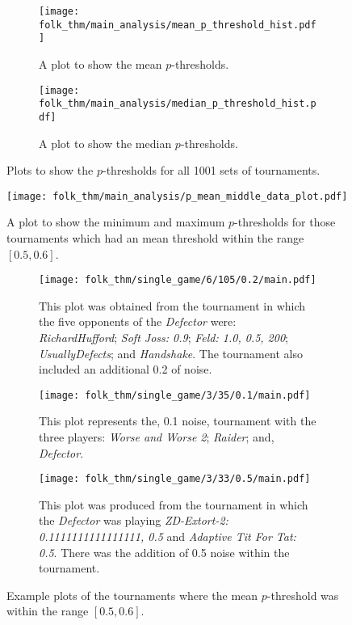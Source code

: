 \begin{figure}
    \begin{subfigure}{.45\textwidth}
        \centering
        \texttt{[image: folk\_thm/main\_analysis/mean\_p\_threshold\_hist.pdf]}
        \caption{A plot to show the mean \(p\)-thresholds.}\label{subfig:mean_p_thresh}
    \end{subfigure}
    \begin{subfigure}{.45\textwidth}
        \centering
        \texttt{[image: folk\_thm/main\_analysis/median\_p\_threshold\_hist.pdf]}
        \caption{A plot to show the median \(p\)-thresholds.}\label{subfig:median_p_thresh}
    \end{subfigure}
    \caption{Plots to show the \(p\)-thresholds for all 1001 sets of tournaments.}\label{fig:mean_median_p_thresh}
\end{figure}


\begin{figure}
    \centering
    \texttt{[image: folk\_thm/main\_analysis/p\_mean\_middle\_data\_plot.pdf]}
    \caption{A plot to show the minimum and maximum \(p\)-thresholds for those tournaments which had an mean threshold within the range \([0.5, 0.6]\).}\label{fig:p_mean_middle_plot}
\end{figure}


\begin{figure}
    \begin{subfigure}{0.3\textwidth}
        \centering
        \texttt{[image: folk\_thm/single\_game/6/105/0.2/main.pdf]}
        \caption{This plot was obtained from the tournament in which the five
        opponents of the \textit{Defector} were: \textit{RichardHufford};
        \textit{Soft Joss: 0.9}; \textit{Feld: 1.0, 0.5, 200};
        \textit{UsuallyDefects}; and \textit{Handshake}. The tournament also included an additional 0.2 of noise.}
    \end{subfigure}
    \begin{subfigure}{0.3\textwidth}
        \centering
        \texttt{[image: folk\_thm/single\_game/3/35/0.1/main.pdf]}
        \caption{This plot represents the, 0.1 noise, tournament with the three players: \textit{Worse and Worse 2}; \textit{Raider}; and, \textit{Defector}.}
    \end{subfigure}
    \begin{subfigure}{0.3\textwidth}
        \centering
        \texttt{[image: folk\_thm/single\_game/3/33/0.5/main.pdf]}
        \caption{This plot was produced from the tournament in which the \textit{Defector} was playing \textit{ZD-Extort-2: 0.1111111111111111, 0.5} and \textit{Adaptive Tit For Tat: 0.5}. There was the addition of 0.5 noise within the tournament.}
    \end{subfigure}
    \caption{Example plots of the tournaments where the mean \(p\)-threshold was within the range \([0.5, 0.6]\).}\label{fig:mean_middle_specific}
\end{figure}

